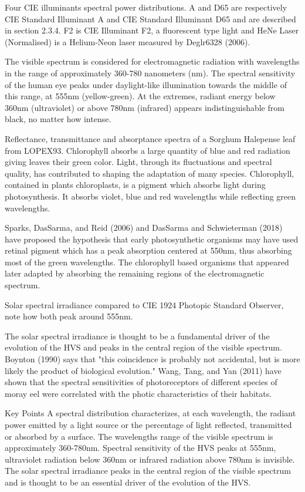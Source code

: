Four CIE illuminants spectral power distributions. A and D65 are respectively CIE Standard Illuminant A and CIE Standard Illuminant D65 and are described in section 2.3.4. F2 is CIE Illuminant F2, a fluorescent type light and HeNe Laser (Normalised) is a Helium-Neon laser measured by Deglr6328 (2006).

The visible spectrum is considered for electromagnetic radiation with wavelengths in the range of approximately 360-780 nanometers (nm). The spectral sensitivity of the human eye peaks under daylight-like illumination towards the middle of this range, at 555nm (yellow-green). At the extremes, radiant energy below 360nm (ultraviolet)  or above 780nm (infrared) appears indistinguishable from black, no matter how intense.


Reflectance, transmittance and absorptance spectra of a Sorghum Halepense leaf from LOPEX93. Chlorophyll absorbs a large quantity of blue and red radiation giving leaves their green color.
Light, through its fluctuations and spectral quality, has contributed to shaping the adaptation of many species. Chlorophyll, contained in plants chloroplasts, is a pigment which absorbs light during photosynthesis. It absorbs violet, blue and red wavelengths while reflecting green wavelengths. 

Sparks, DasSarma, and Reid (2006) and DasSarma and Schwieterman (2018) have proposed the hypothesis that early photosynthetic organisms may have used retinal pigment which has a peak absorption centered at 550nm, thus absorbing most of the green wavelengths. The chlorophyll based organisms that appeared later adapted by absorbing the remaining regions of the electromagnetic spectrum.



Solar spectral irradiance compared to CIE 1924 Photopic Standard Observer, note how both peak around 555nm.

The solar spectral irradiance is thought to be a fundamental driver of the evolution of the HVS and peaks in the central region of the visible spectrum. Boynton (1990) says that "this coincidence is probably not accidental, but is more likely the product of biological evolution." Wang, Tang, and Yan (2011) have shown that the spectral sensitivities of photoreceptors of different species of moray eel were correlated with the photic characteristics of their habitats.

Key Points
A spectral distribution characterizes, at each wavelength, the radiant power emitted by a light source or the percentage of light reflected, transmitted or absorbed by a surface.
The wavelengths range of the visible spectrum is approximately 360-780nm.
Spectral sensitivity of the HVS peaks at 555nm, ultraviolet radiation below 360nm or infrared radiation above 780nm is invisible.
The solar spectral irradiance peaks in the central region of the visible spectrum and is thought to be an essential driver of the evolution of the HVS.



